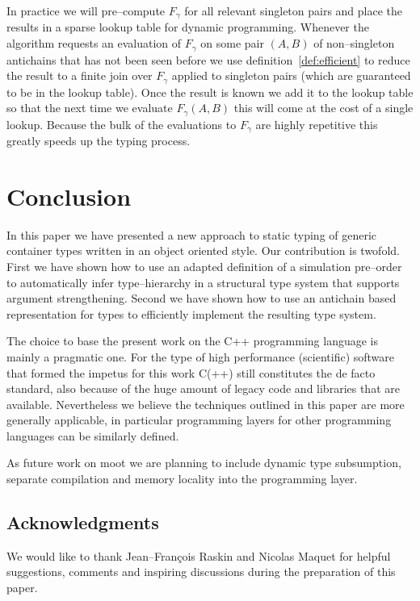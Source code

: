 \documentclass{sigplanconf}
\begin{document}
In practice we will pre--compute $F_\gamma$ for all relevant singleton
pairs and place the results in a sparse lookup table for dynamic
programming. Whenever the algorithm requests an evaluation of
$F_\gamma$ on some pair $(A, B)$ of non--singleton antichains that has
not been seen before we use definition~\ref{def:efficient} to reduce
the result to a finite join over $F_\gamma$ applied to singleton pairs
(which are guaranteed to be in the lookup table). Once the result is
known we add it to the lookup table so that the next time we evaluate
$F_\gamma(A, B)$ this will come at the cost of a single
lookup. Because the bulk of the evaluations to $F_\gamma$ are highly
repetitive this greatly speeds up the typing process.

\section{Conclusion}\label{sec:conclusion}

In this paper we have presented a new approach to static typing of
generic container types written in an object oriented style. Our
contribution is twofold. First we have shown how to use an adapted
definition of a simulation pre--order to automatically infer
type--hierarchy in a structural type system that supports argument
strengthening. Second we have shown how to use an antichain based
representation for types to efficiently implement the resulting type
system.

The choice to base the present work on the C++ programming language is
mainly a pragmatic one. For the type of high performance (scientific)
software that formed the impetus for this work C(++) still constitutes
the de facto standard, also because of the huge amount of legacy code
and libraries that are available.
Nevertheless we believe the techniques outlined in this paper are more
generally applicable, in particular programming layers for other
programming languages can be similarly defined.

As future work on {\sc moot} we are planning to include dynamic type
subsumption, separate compilation and memory locality into the
programming layer.

\subsection{Acknowledgments}

We would like to thank Jean--Fran\c cois Raskin and Nicolas Maquet for
helpful suggestions, comments and inspiring discussions during the
preparation of this paper.

 
\end{document}
